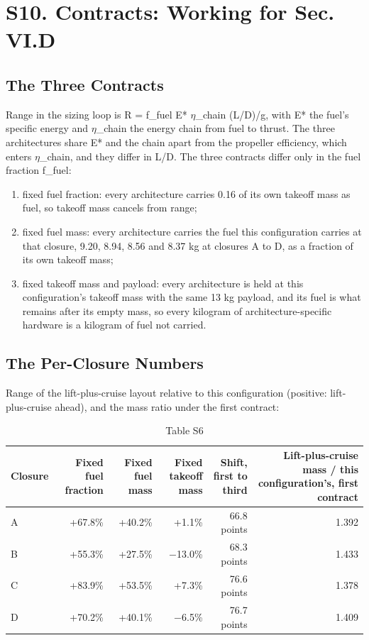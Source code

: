 \documentclass[journal]{new-aiaa}
\begin{document}
\section*{S10. Contracts: Working for Sec. VI.D}

\subsection*{The Three Contracts}

Range in the sizing loop is R = f\_fuel E* $\eta$\_chain (L/D)/g, with E* the fuel's specific energy and $\eta$\_chain the energy chain from fuel to thrust. The three architectures share E* and the chain apart from the propeller efficiency, which enters $\eta$\_chain, and they differ in L/D. The three contracts differ only in the fuel fraction f\_fuel:

\begin{enumerate}[label=\arabic*)]
\item fixed fuel fraction: every architecture carries 0.16 of its own takeoff mass as fuel, so takeoff mass cancels from range;
\item fixed fuel mass: every architecture carries the fuel this configuration carries at that closure, 9.20, 8.94, 8.56 and 8.37 kg at closures A to D, as a fraction of its own takeoff mass;
\item fixed takeoff mass and payload: every architecture is held at this configuration's takeoff mass with the same 13 kg payload, and its fuel is what remains after its empty mass, so every kilogram of architecture-specific hardware is a kilogram of fuel not carried.
\end{enumerate}

\subsection*{The Per-Closure Numbers}

Range of the lift-plus-cruise layout relative to this configuration (positive: lift-plus-cruise ahead), and the mass ratio under the first contract:

\begin{table}[htbp]
\centering
\caption*{Table S6}
\small
\begin{tabularx}{\linewidth}{Xrrrrr}
\hline
Closure & Fixed fuel fraction & Fixed fuel mass & Fixed takeoff mass & Shift, first to third & Lift-plus-cruise mass / this configuration's, first contract \\ \hline
A & +67.8\% & +40.2\% & +1.1\% & 66.8 points & 1.392 \\
B & +55.3\% & +27.5\% & $-$13.0\% & 68.3 points & 1.433 \\
C & +83.9\% & +53.5\% & +7.3\% & 76.6 points & 1.378 \\
D & +70.2\% & +40.1\% & $-$6.5\% & 76.7 points & 1.409 \\
\hline
\end{tabularx}
\end{table}
\end{document}
